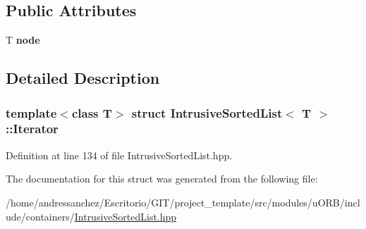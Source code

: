 \subsection*{Public Attributes}
\begin{DoxyCompactItemize}
\item 
\mbox{\label{structIntrusiveSortedList_1_1Iterator_ac93d1a76a9d6cee80dc0fe7a9e66684b}} 
T {\bfseries node}
\end{DoxyCompactItemize}


\subsection{Detailed Description}
\subsubsection*{template$<$class T$>$\newline
struct Intrusive\+Sorted\+List$<$ T $>$\+::\+Iterator}



Definition at line 134 of file Intrusive\+Sorted\+List.\+hpp.



The documentation for this struct was generated from the following file\+:\begin{DoxyCompactItemize}
\item 
/home/andressanchez/\+Escritorio/\+G\+I\+T/project\+\_\+template/src/modules/u\+O\+R\+B/include/containers/\hyperlink{IntrusiveSortedList_8hpp}{Intrusive\+Sorted\+List.\+hpp}\end{DoxyCompactItemize}
